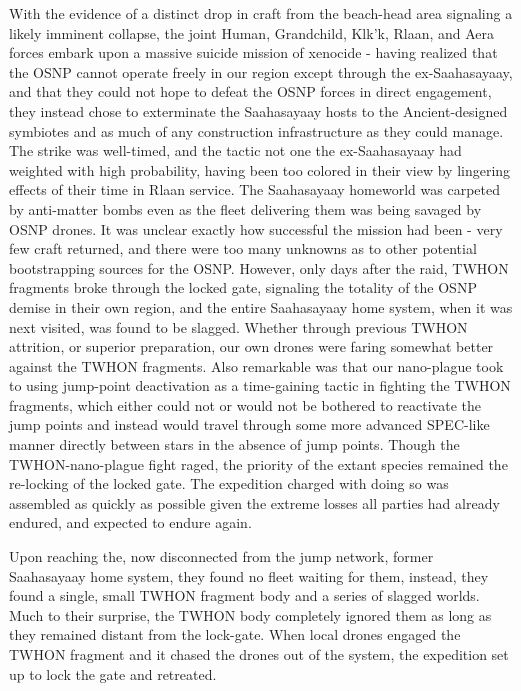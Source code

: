 With the evidence of a distinct drop in craft from the beach-head area
signaling a likely imminent collapse, the joint Human, Grandchild,
Klk'k, Rlaan, and Aera forces embark upon a massive suicide mission of
xenocide - having realized that the OSNP cannot operate freely in our
region except through the ex-Saahasayaay, and that they could not hope
to defeat the OSNP forces in direct engagement, they instead chose to
exterminate the Saahasayaay hosts to the Ancient-designed symbiotes
and as much of any construction infrastructure as they could
manage. The strike was well-timed, and the tactic not one the
ex-Saahasayaay had weighted with high probability, having been too
colored in their view by lingering effects of their time in Rlaan
service. The Saahasayaay homeworld was carpeted by anti-matter bombs
even as the fleet delivering them was being savaged by OSNP drones. It
was unclear exactly how successful the mission had been - very few
craft returned, and there were too many unknowns as to other potential
bootstrapping sources for the OSNP. However, only days after the raid,
TWHON fragments broke through the locked gate, signaling the totality
of the OSNP demise in their own region, and the entire Saahasayaay
home system, when it was next visited, was found to be
slagged. Whether through previous TWHON attrition, or superior
preparation, our own drones were faring somewhat better against the
TWHON fragments. Also remarkable was that our nano-plague took to
using jump-point deactivation as a time-gaining tactic in fighting the
TWHON fragments, which either could not or would not be bothered to
reactivate the jump points and instead would travel through some more
advanced SPEC-like manner directly between stars in the absence of
jump points. Though the TWHON-nano-plague fight raged, the priority of
the extant species remained the re-locking of the locked gate. The
expedition charged with doing so was assembled as quickly as possible
given the extreme losses all parties had already endured, and expected
to endure again.

Upon reaching the, now disconnected from the jump network, former
Saahasayaay home system, they found no fleet waiting for them,
instead, they found a single, small TWHON fragment body and a series
of slagged worlds. Much to their surprise, the TWHON body completely
ignored them as long as they remained distant from the lock-gate. When
local drones engaged the TWHON fragment and it chased the drones out
of the system, the expedition set up to lock the gate and retreated.

